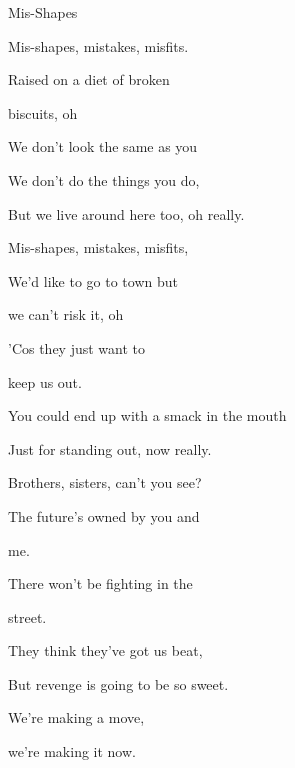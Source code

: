 \begin{song}{Mis-Shapes}{

    \chordset[Verse]{ \AMaj \EMaj \Fshm \DMaj \DSeven}

    \chordset[Chorus]{ \GMaj \GMajSeven \GSeven \CMaj \CMajSeven \CSeven }
	
	\chordset{ \Em \EmSix \EmaddC }

}

	 \begin{songverse}
		Mis-shapes, mistakes, misfits. 

		Raised on a diet of broken 
		
		biscuits, oh 

		We don't look the same as you 
		
		We don't do the things you do,
		
		But we live around here too, oh really. 
	 \end{songverse}

	 \begin{songverse}
		Mis-shapes, mistakes, misfits,

		We'd like to go to town but 
		
		we can't risk it, oh \ch{F\#m} 

		'Cos they just want to 
		
		keep us out. \ch{D}
		
		You could end up with a smack in the mouth

		Just for standing out, now really.
	 \end{songverse}

	 \begin{songverse}

		Brothers, sisters, can't you see? 

		The future's owned by you and 
		
		me. 

		There won't be fighting in the 
		
		street. 

		They think they've got us beat, 

		But revenge is going to be so sweet. 
	\end{songverse}

	\begin{songchorus}
		
		 \quad We're making a move, 

		we're making it now. 


\end{songchorus}
\end{song}

